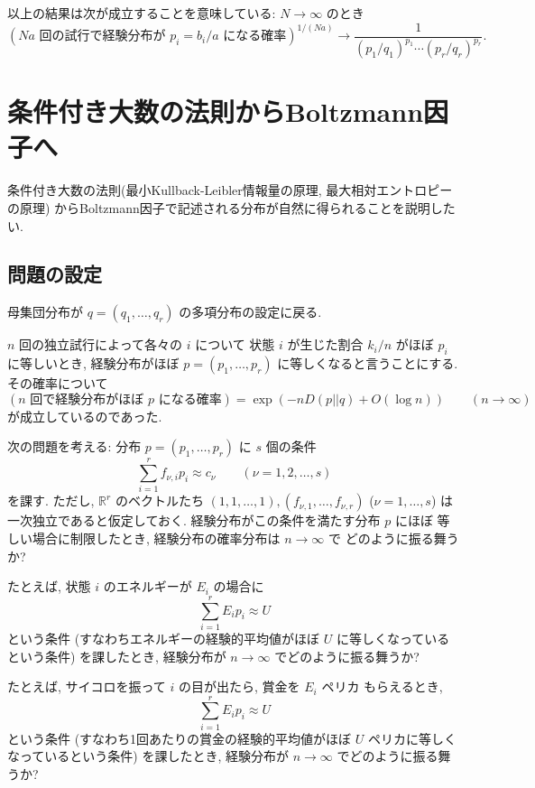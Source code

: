 \documentclass[12pt,twoside]{jarticle}
\newcommand\R{{\mathbb R}} %
\theoremstyle{jplain}
\theoremstyle{jplain}
\theoremstyle{jplain}
\numberwithin{theorem}{section}
\numberwithin{equation}{section}
\numberwithin{figure}{section}
\numberwithin{table}{section}
\begin{document}
以上の結果は次が成立することを意味している: $N\to\infty$ のとき
\[
(\text{$Na$ 回の試行で経験分布が $p_i=b_i/a$ になる確率})^{1/(Na)}\to\frac{1}{(p_1/q_1)^{p_1}\cdots(p_r/q_r)^{p_r}}.
\]



\section{条件付き大数の法則からBoltzmann因子へ}
\label{sec:Boltzmann-factors}

条件付き大数の法則(最小Kullback-Leibler情報量の原理, 最大相対エントロピーの原理)
からBoltzmann因子で記述される分布が自然に得られることを説明したい.


\subsection{問題の設定}

母集団分布が $q=(q_1,\ldots,q_r)$ の多項分布の設定に戻る.

$n$ 回の独立試行によって各々の $i$ について
状態 $i$ が生じた割合 $k_i/n$ がほぼ $p_i$ に等しいとき, 
経験分布がほぼ $p=(p_1,\ldots,p_r)$ に等しくなると言うことにする.
その確率について 
\[
(\text{$n$ 回で経験分布がほぼ $p$ になる確率})
=
\exp(-n D(p||q) + O(\log n))
\qquad (n\to\infty)
\]
が成立しているのであった. 

次の問題を考える: 分布 $p=(p_1,\ldots,p_r)$ に $s$ 個の条件
\[
\sum_{i=1}^r f_{\nu,i}p_i \approx c_\nu
\qquad (\nu=1,2,\ldots,s)
\tag{$*$}
\]
を課す. 
ただし, $\R^r$ のベクトルたち $(1,1,\ldots,1),(f_{\nu,1},\ldots,f_{\nu,r})$ 
($\nu=1,\ldots,s$) は一次独立であると仮定しておく.
経験分布がこの条件を満たす分布 $p$ にほぼ
等しい場合に制限したとき, 経験分布の確率分布は $n\to\infty$ で
どのように振る舞うか?

たとえば, 状態 $i$ のエネルギーが $E_i$ の場合に
\[
\sum_{i=1}^r E_i p_i \approx U
\]
という条件
(すなわちエネルギーの経験的平均値がほぼ $U$ に等しくなっているという条件)
を課したとき, 経験分布が $n\to\infty$ でどのように振る舞うか?

たとえば, サイコロを振って $i$ の目が出たら, 賞金を $E_i$ ペリカ
もらえるとき,
\[
\sum_{i=1}^r E_i p_i \approx U
\]
という条件
(すなわち1回あたりの賞金の経験的平均値がほぼ $U$ ペリカに等しくなっているという条件)
を課したとき, 経験分布が $n\to\infty$ でどのように振る舞うか?
\end{document}
